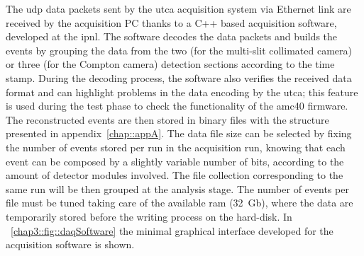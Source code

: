 The \gls{udp} data packets sent by the \gls{utca} acquisition system via Ethernet link are received by the acquisition PC thanks to a C++ based acquisition software, developed at the \gls{ipnl}. The software decodes the data packets and builds the events by grouping the data from the two (for the multi-slit collimated camera) or three (for the Compton camera) detection sections according to the time stamp. During the decoding process, the software also verifies the received data format and can highlight problems in the data encoding by the \gls{utca}; this feature is used during the test phase to check the functionality of the \gls{amc}40 firmware. The reconstructed events are then stored in binary files with the structure presented in appendix~\ref{chap::appA}. The data file size can be selected by fixing the number of events stored per run in the acquisition run, knowing that each event can be composed by a slightly variable number of bits, according to the amount of detector modules involved. The file collection corresponding to the same run will be then grouped at the analysis stage. The number of events per file must be tuned taking care of the available \gls{ram} (32~Gb), where the data are temporarily stored before the writing process on the hard-disk. In \figurename~\ref{chap3::fig::daqSoftware} the minimal graphical interface developed for the acquisition software is shown.



